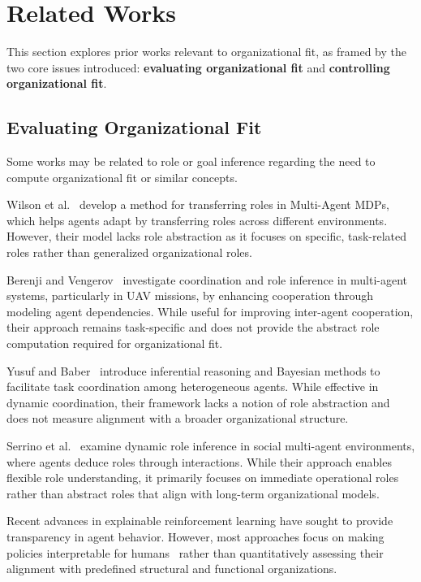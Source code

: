 \documentclass[conference]{IEEEtran}
\begin{document}
\section{Related Works}
\label{sec:related_works}

This section explores prior works relevant to organizational fit, as framed by the two core issues introduced: \textbf{evaluating organizational fit} and \textbf{controlling organizational fit}.

\subsection{Evaluating Organizational Fit}

Some works may be related to role or goal inference regarding the need to compute organizational fit or similar concepts.

Wilson et al.~\cite{wilson2008learning} develop a method for transferring roles in Multi-Agent MDPs, which helps agents adapt by transferring roles across different environments. However, their model lacks role abstraction as it focuses on specific, task-related roles rather than generalized organizational roles.

Berenji and Vengerov~\cite{berenji2000learning} investigate coordination and role inference in multi-agent systems, particularly in UAV missions, by enhancing cooperation through modeling agent dependencies. While useful for improving inter-agent cooperation, their approach remains task-specific and does not provide the abstract role computation required for organizational fit.

Yusuf and Baber~\cite{yusuf2020inferential} introduce inferential reasoning and Bayesian methods to facilitate task coordination among heterogeneous agents. While effective in dynamic coordination, their framework lacks a notion of role abstraction and does not measure alignment with a broader organizational structure.

Serrino et al.~\cite{serrino2019finding} examine dynamic role inference in social multi-agent environments, where agents deduce roles through interactions. While their approach enables flexible role understanding, it primarily focuses on immediate operational roles rather than abstract roles that align with long-term organizational models.

Recent advances in explainable reinforcement learning have sought to provide transparency in agent behavior. However, most approaches focus on making policies interpretable for humans~\cite{van2018explainable} rather than quantitatively assessing their alignment with predefined structural and functional organizations.
\end{document}
